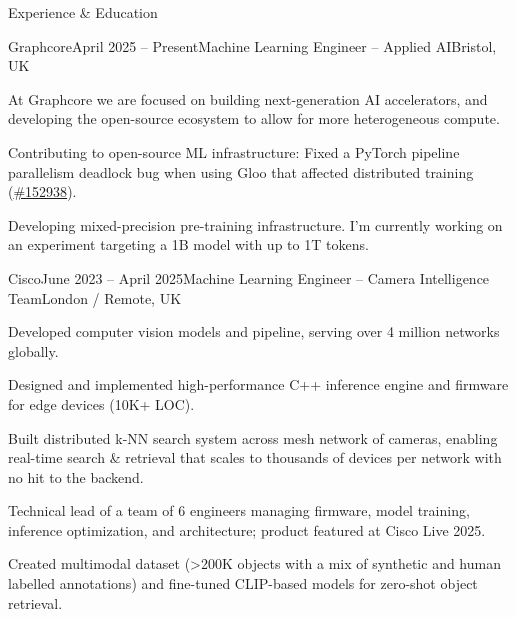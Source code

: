 \documentclass{structure}
\begin{document}
\begin{rSection}{Experience \& Education}
    \begin{rSubsection}{Graphcore}{April 2025 -- Present}{Machine Learning Engineer -- Applied AI}{Bristol, UK}{}{}
    \item At Graphcore we are focused on building next-generation AI accelerators, and developing the open-source ecosystem to allow for more heterogeneous compute.

    \item Contributing to open-source ML infrastructure: Fixed a PyTorch pipeline parallelism deadlock bug when using Gloo that affected distributed training ({\color{blue}\href{https://github.com/pytorch/pytorch/pull/152938}{\#152938}}).

    \item Developing mixed-precision pre-training infrastructure. I'm currently working on an experiment targeting a 1B model with up to 1T tokens.
    \end{rSubsection}

    \begin{rSubsection}{Cisco}{June 2023 -- April 2025}{Machine Learning Engineer -- Camera Intelligence Team}{London / Remote, UK}{}{}
        \item Developed computer vision models and pipeline, serving over 4 million networks globally.

        \item Designed and implemented high-performance C++ inference engine and firmware for edge devices (10K+ LOC).

        \item Built distributed k-NN search system across mesh network of cameras, enabling real-time search \& retrieval that scales to thousands of devices per network with no hit to the backend.

        \item Technical lead of a team of 6 engineers managing firmware, model training, inference optimization, and architecture; product featured at Cisco Live 2025.

        \item Created multimodal dataset (>200K objects with a mix of synthetic and human labelled annotations) and fine-tuned CLIP-based models for zero-shot object retrieval.
    \end{rSubsection}

\end{rSection}
\end{document}
